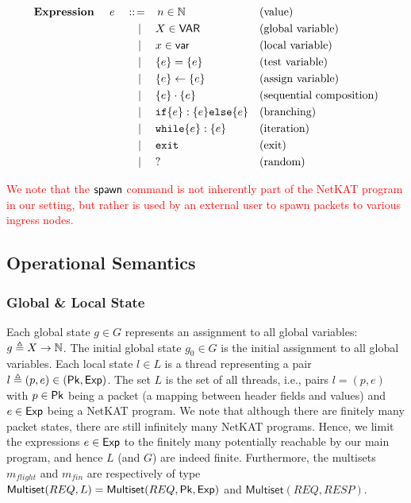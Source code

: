 \begin{align*}
	\textbf{Expression } \quad e \quad ::
	&\!=\! \quad n \in \mathbb{N}
	&&\text{(value)} \\
	&\mid\quad X \in \mathsf{VAR} &&\text{(global variable)} \\
	&\mid\quad x \in \mathsf{var}
	&&\text{(local variable)} \\
	&\mid\quad \{e\}=\{e\} &&\text{(test variable)} \\
	&\mid\quad \{e\}\leftarrow\{e\} &&\text{(assign variable)} \\
	&\mid\quad \{e\} \cdot \{e\} &&\text{(sequential composition)} \\
	&\mid\quad \texttt{if} \{e\}:\{e\} \texttt{else} \{e\} 
	&&\text{(branching)} \\
	&\mid\quad \texttt{while} \{e\}:\{e\} 
	&&\text{(iteration)} \\
	&\mid\quad \texttt{exit} &&\text{(exit)} \\
	&\mid\quad {?} &&\text{(random)}
\end{align*}

\textcolor{red}{We note that the $\mathsf{spawn}$ command is not inherently part of the NetKAT 
	program in our setting, but rather is used by an external user to spawn packets 
	to various ingress nodes.}




\subsection{Operational Semantics}


	
	\subsubsection{Global \& Local State}
	Each global state \( g \in G \) represents an assignment to all global 
	variables: \( g \triangleq X \to \mathbb{N} \). The initial global state \( g_0 \in G 
	\) is the initial assignment to all global variables. Each local state \( l \in 
	L \) is a thread representing a pair \( l \triangleq (p, e) \in (\mathsf{Pk}, 
	\mathsf{Exp}) \). The set \( L \) is the set of all threads, i.e., pairs \( l = (p, e) 
	\) with \( p \in \mathsf{Pk} \) being a packet (a mapping between header fields and 
	values) and \( e \in \mathsf{Exp} \) being a NetKAT program. We note that although 
	there are finitely many packet states, there are still infinitely many NetKAT 
	programs. Hence, we limit the expressions \( e \in \mathsf{Exp} \) to the finitely many 
	potentially reachable by our main program, and hence $L$ (and $G$) are indeed 
	finite. 
	Furthermore, the multisets \( m_{flight} 
	\) and \( m_{fin} \) are respectively of 
	type \( \mathsf{Multiset}(REQ, L) = \mathsf{Multiset}(REQ, \mathsf{Pk}, \mathsf{Exp}) \) and \( 
	\mathsf{Multiset}(REQ, RESP) \).
	
